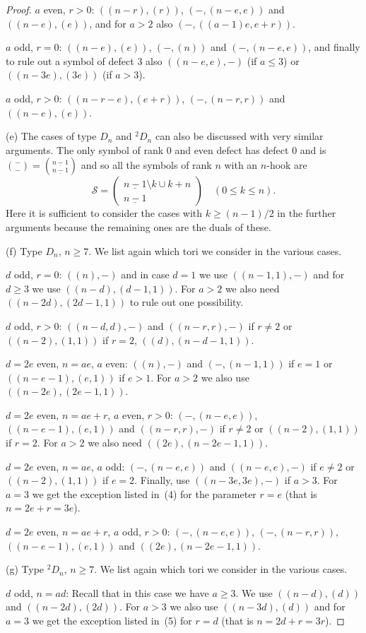 \documentclass{ert-l}
\newcommand{\cS}{{\mathcal{S}}}
\newcommand{\ul}[1]{\underline{#1}}
\newcommand{\sy}[2]{\ensuremath{\left(\begin{array}{c}{#1}\\{#2}\end{array}\right)}}
\newcommand{\tw}[1]{{}^#1\!}
\let\sm=\setminus
\let\sys=\binom
\theoremstyle{definition}
\theoremstyle{remark}
\begin{document}
\begin{proof}
$a$ even, $r>0$: $((n-r),(r))$, $(-,(n-e,e))$ and $((n-e),(e))$, and for
$a>2$ also $(-,((a-1)e, e+r))$.

$a$ odd, $r=0$: $((n-e),(e))$, $(-,(n))$ and $(-,(n-e,e))$, and finally to
rule out a symbol of defect 3 also $((n-e,e),-)$ (if $a\leq 3$) or
$((n-3e), (3e))$ (if $a>3$).

$a$ odd, $r>0$: $((n-r-e),(e+r))$, $(-,(n-r,r))$ and $((n-e),(e))$.

(e) The cases of type $D_n$ and $\tw2D_n$ can also be discussed with very
similar arguments. The only symbol of rank $0$ and even defect has defect
$0$ and is $\sys{-}{-} = \sys{\ul{n-1}}{\ul{n-1}}$ and so all the symbols of
rank $n$ with an $n$-hook are
\[ \cS=\sy{\ul{n-1}\sm k \cup k+n}{\ul{n-1}} \quad (0\leq k \leq n).\]
Here it is sufficient to consider the cases with $k\geq (n-1)/2$ in the
further arguments because the remaining ones are the duals of these.

(f) Type $D_n$, $n\geq 7$. We list again which tori we consider in the
various cases.

$d$ odd, $r=0$:
$((n),-)$ and in case $d=1$ we use $((n-1, 1),-)$ and for $d\geq 3$
we use $((n-d),(d-1,1))$. For $a>2$ we also need $((n-2d),(2d-1,1))$ to rule
out one possibility.

$d$ odd, $r>0$: $((n-d,d),-)$ and $((n-r,r),-)$ if $r\neq 2$ or
$((n-2),(1,1))$ if $r=2$, $((d),(n-d-1,1))$.

$d=2e$ even, $n=ae$, $a$ even: $((n),-)$ and $(-,(n-1,1))$ if $e=1$
or $((n-e-1),(e,1))$ if $e>1$. For $a>2$ we also use $((n-2e),(2e-1,1))$.

$d=2e$ even, $n=ae+r$, $a$ even, $r>0$: $(-,(n-e,e))$, $((n-e-1),(e,1))$ and
$((n-r,r),-)$ if $r\neq 2$ or $((n-2),(1,1))$ if $r=2$. For $a>2$ we
also need $((2e),(n-2e-1,1))$.

$d=2e$ even, $n=ae$, $a$ odd: $(-,(n-e,e))$ and $((n-e,e),-)$ if $e \neq 2$
or $((n-2),(1,1))$ if $e=2$. Finally, use $((n-3e,3e),-)$ if $a > 3$. For
$a=3$ we get the exception listed in~(4) for the parameter $r=e$ (that is
$n = 2e+r = 3e$).

$d=2e$ even, $n=ae+r$, $a$ odd, $r>0$: $(-,(n-e,e))$, $(-,(n-r,r))$,
$((n-e-1),(e,1))$ and $((2e),(n-2e-1,1))$.

(g) Type $\tw2D_n$, $n\geq 7$. We list again which tori we consider in the
various cases.

$d$ odd, $n=ad$: Recall that in this case we have $a\geq
3$. We use $((n-d),(d))$ and $((n-2d),(2d))$. For $a > 3$ we also use
$((n-3d),(d))$ and for $a=3$ we get the exception listed in~(5) for $r=d$
(that is $n = 2d+r = 3r$).


\end{proof}
\end{document}
